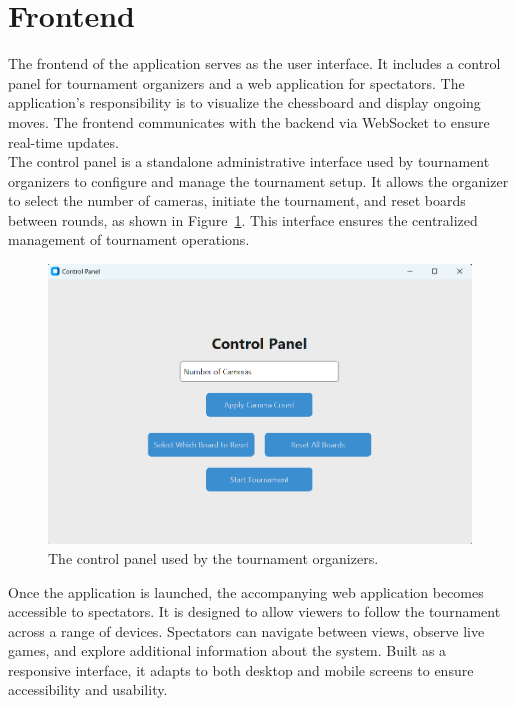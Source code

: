 % 



\section{Frontend}
\label{subsec:results-frontend}
The frontend of the application serves as the user interface. It includes a control panel for tournament organizers and a web application for spectators. The application's responsibility is to visualize the chessboard and display ongoing moves. The frontend communicates with the backend via WebSocket to ensure real-time updates. \\

The control panel is a standalone administrative interface used by tournament organizers to configure and manage the tournament setup. It allows the organizer to select the number of cameras, initiate the tournament, and reset boards between rounds, as shown in Figure~\ref{fig:control-panel}. This interface ensures the centralized management of tournament operations. \\

\begin{figure}[h!] \centering \includegraphics[width=0.75\linewidth]{figures/results/frontend/control-panel/control-panel.png} \caption[Display of control panel]{The control panel used by the tournament organizers.}\label{fig:control-panel} \end{figure}

Once the application is launched, the accompanying web application becomes accessible to spectators. It is designed to allow viewers to follow the tournament across a range of devices. Spectators can navigate between views, observe live games, and explore additional information about the system. Built as a responsive interface, it adapts to both desktop and mobile screens to ensure accessibility and usability. \\

